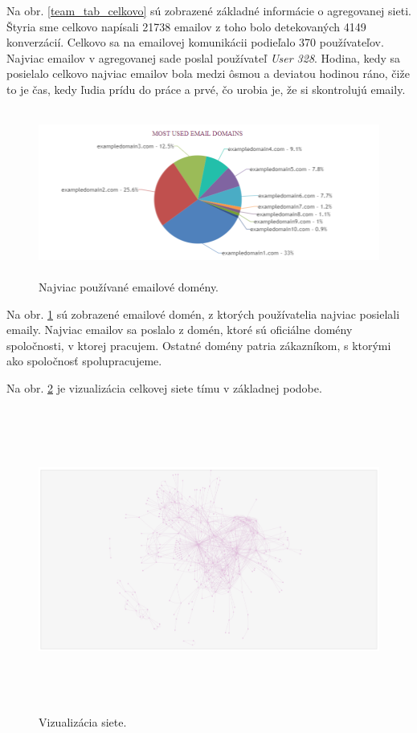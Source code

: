\documentclass[slovak,master,public,dept460,male,cpdeclaration,oneside]{diploma}
\begin{document}
Na obr. \ref{team_tab_celkovo} sú zobrazené základné informácie o agregovanej sieti. Štyria sme celkovo napísali 21738 emailov z toho bolo detekovaných 4149 konverzácií. Celkovo sa na emailovej komunikácii podieľalo 370 používateľov. Najviac emailov v agregovanej sade poslal používateľ \textit{User 328}. Hodina, kedy sa posielalo celkovo najviac emailov bola medzi ôsmou a deviatou hodinou ráno, čiže to je čas, kedy ľudia prídu do práce a prvé, čo urobia je, že si skontrolujú emaily. 

\begin{figure}[H]
\centering
\includegraphics[width=14.5cm, height=5.5cm]{figures/team_domain_celkovo}
\caption{Najviac používané emailové domény.}
\label{team_domain_celkovo}
\end{figure}

Na obr. \ref{team_domain_celkovo} sú zobrazené emailové domén, z ktorých používatelia najviac posielali emaily. Najviac emailov sa poslalo z domén, ktoré sú oficiálne domény spoločnosti, v ktorej pracujem. Ostatné domény patria zákazníkom, s ktorými ako spoločnosť spolupracujeme. 

Na obr. \ref{team_net_celkovo} je vizualizácia celkovej siete tímu v základnej podobe.


\begin{figure}[H]
\centering
\includegraphics[width=16cm, height=10cm]{figures/team_net_celkovo}
\caption{Vizualizácia siete.}
\label{team_net_celkovo}
\end{figure}
\end{document}

